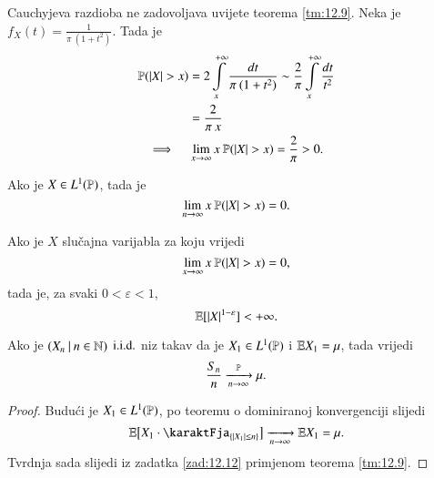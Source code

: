 \begin{pr}  \label{pr:12.11}
    Cauchyjeva razdioba ne zadovoljava uvijete teorema \ref{tm:12.9}.
    Neka je $f_X (t) = \frac{1}{\pi \: (1 + t^2)}$.
    Tada je
    \begin{equation*}
        \begin{gathered}
            \begin{aligned}
                \mathbb{P}({|X| > x}) &= 2 \int\limits_x^{+\infty} \frac{dt}{\pi \: (1 + t^2)} \sim \frac{2}{\pi} \int\limits_x^{+\infty} \frac{dt}{t^2}\\
                &= \frac{2}{\pi \: x}
            \end{aligned}\\
            \implies \quad \lim\limits_{x \to \infty} x \: \mathbb{P}({|X| > x}) = \frac{2}{\pi} > 0.
        \end{gathered}
    \end{equation*}
\end{pr}

\begin{zad} \label{zad:12.12}
    Ako je $X \in L^1(\mathbb{P})$, tada je
    \begin{equation*}
        \lim\limits_{n \to \infty} x \: \mathbb{P}({|X| > x}) = 0.
    \end{equation*}
\end{zad}

\begin{zad} \label{zad:12.13}
    Ako je $X$ slu\v cajna varijabla za koju vrijedi
    \begin{equation*}
        \lim\limits_{x \to \infty} x \: \mathbb{P}({|X| > x}) = 0,
    \end{equation*}
    tada je, za svaki $0 < \varepsilon < 1$,
    \begin{equation*}
        \mathbb{E} [ |X|^{1 - \varepsilon} ] < +\infty.
    \end{equation*}
\end{zad}

\begin{kor} \label{kor:12.14}
    Ako je $({X_n} \: | \: {n \in \mathbb{N}})$ $\mathrm{i.i.d.}$ niz takav da je $X_1 \in L^1(\mathbb{P})$ i $\mathbb{E} X_1 = \mu$, tada vrijedi
    \begin{equation*}
        \frac{S_n}{n} \xrightarrow[n \to \infty]{\mathbb{P}} \mu.
    \end{equation*}
\end{kor}

\begin{proof}
    Budu\' ci je $X_1 \in L^1(\mathbb{P})$, po teoremu o dominiranoj konvergenciji slijedi
    \begin{equation*}
        \masE \big[ X_1 \cdot \karaktFja_{\{ |X_1| \leq n \}} \big] \xrightarrow[n \to \infty]{} \masE X_1 = \mu.
    \end{equation*}
    Tvrdnja sada slijedi iz zadatka \ref{zad:12.12} primjenom teorema \ref{tm:12.9}.
\end{proof}

